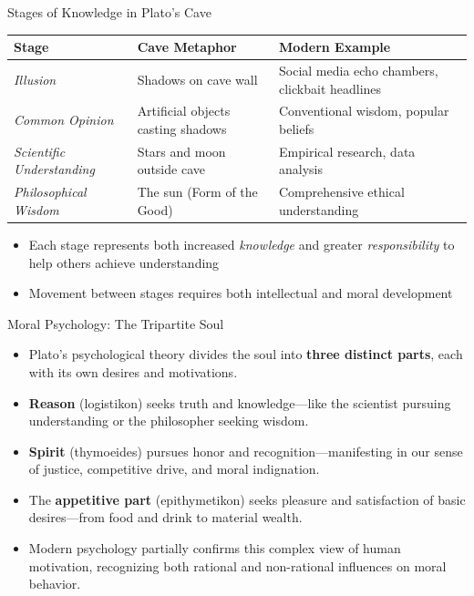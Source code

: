\documentclass[aspectratio=169]{beamer}
\begin{document}
\begin{frame}{Stages of Knowledge in Plato's Cave}
\begin{center}
\begin{tabular}{|p{2.5cm}|p{4cm}|p{4cm}|}
\hline
\textbf{Stage} & \textbf{Cave Metaphor} & \textbf{Modern Example} \\
\hline
\emph{Illusion} & Shadows on cave wall & Social media echo chambers, clickbait headlines \\
\hline
\emph{Common Opinion} & Artificial objects casting shadows & Conventional wisdom, popular beliefs \\
\hline
\emph{Scientific Understanding} & Stars and moon outside cave & Empirical research, data analysis \\
\hline
\emph{Philosophical Wisdom} & The sun (Form of the Good) & Comprehensive ethical understanding \\
\hline
\end{tabular}
\end{center}
\vspace{0.3cm}
\begin{itemize}
\item Each stage represents both increased \emph{knowledge} and greater \emph{responsibility} to help others achieve understanding
\item Movement between stages requires both intellectual and moral development
\end{itemize}
\end{frame}
\begin{frame}{Moral Psychology: The Tripartite Soul}
\begin{itemize}
\item Plato's psychological theory divides the soul into \textbf{three distinct parts}, each with its own desires and motivations.
\item \textbf{Reason} (logistikon) seeks truth and knowledge—like the scientist pursuing understanding or the philosopher seeking wisdom.
\item \textbf{Spirit} (thymoeides) pursues honor and recognition—manifesting in our sense of justice, competitive drive, and moral indignation.
\item The \textbf{appetitive part} (epithymetikon) seeks pleasure and satisfaction of basic desires—from food and drink to material wealth.
\item Modern psychology partially confirms this complex view of human motivation, recognizing both rational and non-rational influences on moral behavior.
\end{itemize}
\end{frame}
\end{document}
